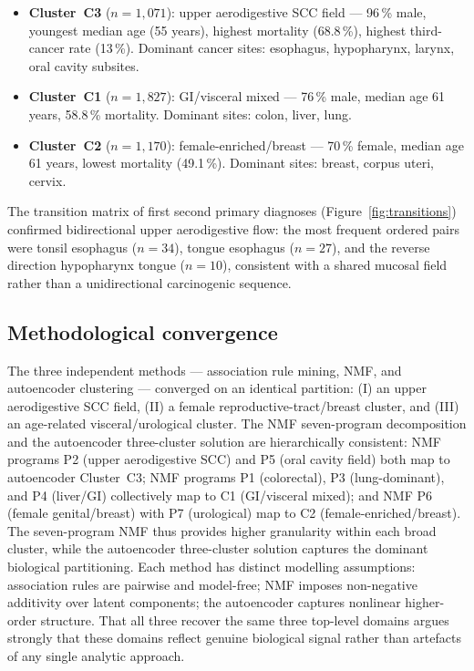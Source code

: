 \documentclass[review,12pt]{elsarticle}
\begin{document}
\begin{itemize}[noitemsep]
  \item \textbf{Cluster~C3} ($n = 1{,}071$): upper aerodigestive SCC field ---
    96\,\% male, youngest median age (55 years), highest mortality (68.8\,\%),
    highest third-cancer rate (13\,\%). Dominant cancer sites: esophagus,
    hypopharynx, larynx, oral cavity subsites.
  \item \textbf{Cluster~C1} ($n = 1{,}827$): GI/visceral mixed ---
    76\,\% male, median age 61 years, 58.8\,\% mortality.
    Dominant sites: colon, liver, lung.
  \item \textbf{Cluster~C2} ($n = 1{,}170$): female-enriched/breast ---
    70\,\% female, median age 61 years, lowest mortality (49.1\,\%).
    Dominant sites: breast, corpus uteri, cervix.
\end{itemize}

\noindent
The transition matrix of first\,\textrightarrow\,second primary diagnoses
(Figure~\ref{fig:transitions}) confirmed bidirectional upper aerodigestive flow:
the most frequent ordered pairs were tonsil\,\textrightarrow\,esophagus
($n = 34$), tongue\,\textrightarrow\,esophagus ($n = 27$), and the reverse
direction hypopharynx\,\textrightarrow\,tongue ($n = 10$), consistent with
a shared mucosal field rather than a unidirectional carcinogenic sequence.

\subsection{Methodological convergence}
The three independent methods --- association rule mining, NMF, and autoencoder
clustering --- converged on an identical partition: (I) an upper aerodigestive SCC
field, (II) a female reproductive-tract/breast cluster, and (III) an
age-related visceral/urological cluster. The NMF seven-program decomposition
and the autoencoder three-cluster solution are hierarchically consistent:
NMF programs P2 (upper aerodigestive SCC) and P5 (oral cavity field) both map to
autoencoder Cluster~C3; NMF programs P1 (colorectal), P3 (lung-dominant),
and P4 (liver/GI) collectively map to C1 (GI/visceral mixed); and NMF P6
(female genital/breast) with P7 (urological) map to C2 (female-enriched/breast).
The seven-program NMF thus provides higher granularity within each broad
cluster, while the autoencoder three-cluster solution captures the dominant
biological partitioning. Each method has distinct modelling assumptions:
association rules are pairwise and model-free; NMF imposes non-negative
additivity over latent components; the autoencoder captures nonlinear
higher-order structure. That all three recover the same three top-level
domains argues strongly that these domains reflect genuine biological signal
rather than artefacts of any single analytic approach.
\end{document}
